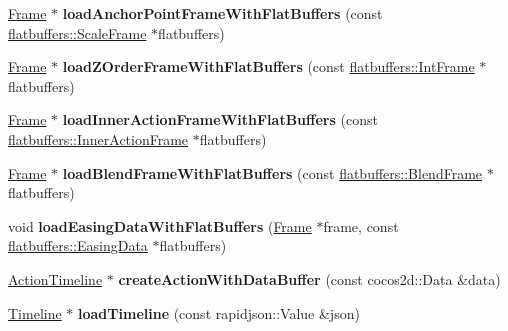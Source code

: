 \begin{DoxyCompactItemize}
\item 
\mbox{\label{classActionTimelineCache_a975695a9c42974089b7017e8dd1ece33}} 
\hyperlink{structflatbuffers_1_1Frame}{Frame} $\ast$ {\bfseries load\+Anchor\+Point\+Frame\+With\+Flat\+Buffers} (const \hyperlink{structflatbuffers_1_1ScaleFrame}{flatbuffers\+::\+Scale\+Frame} $\ast$flatbuffers)
\item 
\mbox{\label{classActionTimelineCache_a14faac2d76550c70c7823cc0e08f7028}} 
\hyperlink{structflatbuffers_1_1Frame}{Frame} $\ast$ {\bfseries load\+Z\+Order\+Frame\+With\+Flat\+Buffers} (const \hyperlink{structflatbuffers_1_1IntFrame}{flatbuffers\+::\+Int\+Frame} $\ast$flatbuffers)
\item 
\mbox{\label{classActionTimelineCache_ac00f9b6552b625624a4f577b3a88e192}} 
\hyperlink{structflatbuffers_1_1Frame}{Frame} $\ast$ {\bfseries load\+Inner\+Action\+Frame\+With\+Flat\+Buffers} (const \hyperlink{structflatbuffers_1_1InnerActionFrame}{flatbuffers\+::\+Inner\+Action\+Frame} $\ast$flatbuffers)
\item 
\mbox{\label{classActionTimelineCache_a9cfdf5dcd38a434777422fe54f1fa387}} 
\hyperlink{structflatbuffers_1_1Frame}{Frame} $\ast$ {\bfseries load\+Blend\+Frame\+With\+Flat\+Buffers} (const \hyperlink{structflatbuffers_1_1BlendFrame}{flatbuffers\+::\+Blend\+Frame} $\ast$flatbuffers)
\item 
\mbox{\label{classActionTimelineCache_a0b1baa3cedaf8a94bc5229c8d0b7f822}} 
void {\bfseries load\+Easing\+Data\+With\+Flat\+Buffers} (\hyperlink{classFrame}{Frame} $\ast$frame, const \hyperlink{structflatbuffers_1_1EasingData}{flatbuffers\+::\+Easing\+Data} $\ast$flatbuffers)
\item 
\mbox{\label{classActionTimelineCache_aac079c37feaa9e33d4c9add7f70fe7f3}} 
\hyperlink{classActionTimeline}{Action\+Timeline} $\ast$ {\bfseries create\+Action\+With\+Data\+Buffer} (const cocos2d\+::\+Data \&data)
\item 
\mbox{\label{classActionTimelineCache_a524640f17ac1db8c538a0f428544186e}} 
\hyperlink{classTimeline}{Timeline} $\ast$ {\bfseries load\+Timeline} (const rapidjson\+::\+Value \&json)

\end{DoxyCompactItemize}
